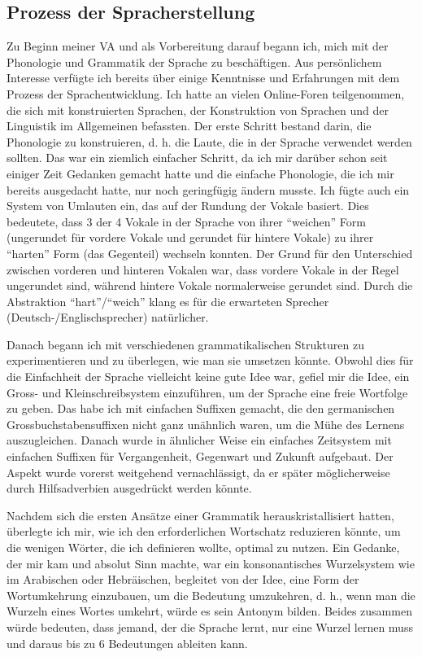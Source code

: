 \documentclass{article}
\begin{document}
\subsection{Prozess der Spracherstellung}
Zu Beginn meiner VA und als Vorbereitung darauf begann ich, mich mit der Phonologie und Grammatik der Sprache zu beschäftigen.
Aus persönlichem Interesse verfügte ich bereits über einige Kenntnisse und Erfahrungen mit dem Prozess der Sprachentwicklung.
Ich hatte an vielen Online-Foren teilgenommen, die sich mit konstruierten Sprachen, der Konstruktion von Sprachen und der
Linguistik im Allgemeinen befassten. Der erste Schritt bestand darin, die Phonologie zu konstruieren, d. h. die Laute,
die in der Sprache verwendet werden sollten. Das war ein ziemlich einfacher Schritt, da ich mir darüber schon seit einiger
Zeit Gedanken gemacht hatte und die einfache Phonologie, die ich mir bereits ausgedacht hatte, nur noch geringfügig ändern musste.
Ich fügte auch ein System von Umlauten ein, das auf der Rundung der Vokale basiert. Dies bedeutete, dass 3 der 4 Vokale
in der Sprache von ihrer ``weichen'' Form (ungerundet für vordere Vokale und gerundet für hintere Vokale) zu ihrer ``harten'' Form
(das Gegenteil) wechseln konnten. Der Grund für den Unterschied zwischen vorderen und hinteren Vokalen war, dass vordere Vokale
in der Regel ungerundet sind, während hintere Vokale normalerweise gerundet sind.\citep{Stevens72} Durch die Abstraktion
``hart''/``weich'' klang es für die erwarteten Sprecher (Deutsch-/Englischsprecher) natürlicher.

Danach begann ich mit verschiedenen grammatikalischen Strukturen zu experimentieren und zu überlegen,
wie man sie umsetzen könnte. Obwohl dies für die Einfachheit der Sprache vielleicht keine gute Idee war,
gefiel mir die Idee, ein Gross- und Kleinschreibsystem einzuführen, um der Sprache eine freie Wortfolge zu geben.
Das habe ich mit einfachen Suffixen gemacht, die den germanischen Grossbuchstabensuffixen nicht ganz unähnlich waren,
um die Mühe des Lernens auszugleichen. Danach wurde in ähnlicher Weise ein einfaches Zeitsystem mit einfachen Suffixen
für Vergangenheit, Gegenwart und Zukunft aufgebaut. Der Aspekt wurde vorerst weitgehend vernachlässigt, da er später
möglicherweise durch Hilfsadverbien ausgedrückt werden könnte.

Nachdem sich die ersten Ansätze einer Grammatik herauskristallisiert hatten, überlegte ich mir,
wie ich den erforderlichen Wortschatz reduzieren könnte, um die wenigen Wörter, die ich definieren wollte,
optimal zu nutzen. Ein Gedanke, der mir kam und absolut Sinn machte, war ein konsonantisches Wurzelsystem wie im Arabischen
oder Hebräischen, begleitet von der Idee, eine Form der Wortumkehrung einzubauen, um die Bedeutung umzukehren, d. h.,
wenn man die Wurzeln eines Wortes umkehrt, würde es sein Antonym bilden. Beides zusammen würde bedeuten, dass jemand,
der die Sprache lernt, nur eine Wurzel lernen muss und daraus bis zu 6 Bedeutungen ableiten kann.
\end{document}
